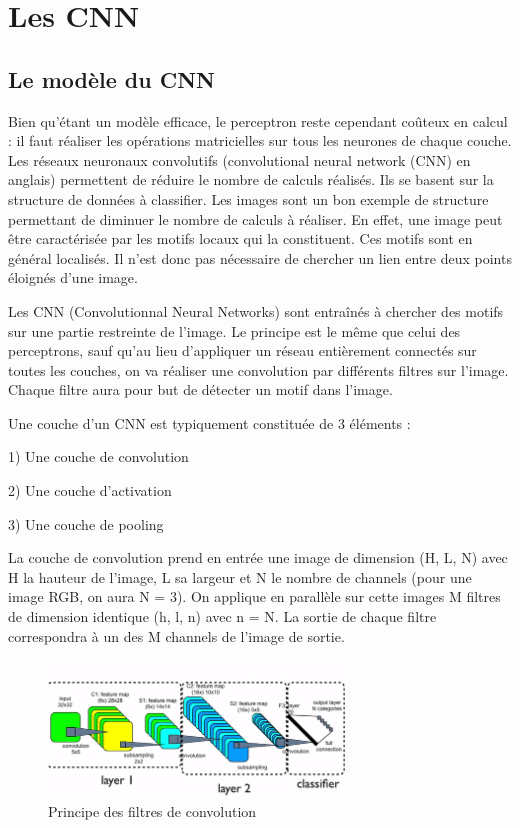 \section{Les CNN}

\fancyhead[R]{\textit{\nouppercase{\leftmark}}}

\subsection{Le modèle du CNN}

Bien qu'étant un modèle efficace, le perceptron reste cependant coûteux en calcul : il faut réaliser les opérations matricielles sur tous les neurones de chaque couche.
Les réseaux neuronaux convolutifs (convolutional neural network (CNN) en anglais) permettent de réduire le nombre de calculs réalisés. Ils se basent sur la structure de données à classifier.
Les images sont un bon exemple de structure permettant de diminuer le nombre de calculs à réaliser. En effet, une image peut être caractérisée par les motifs locaux qui la constituent. Ces motifs sont en général localisés. Il n'est donc pas nécessaire de chercher un lien entre deux points éloignés d'une image.

Les CNN (Convolutionnal Neural Networks) sont entraînés à chercher des motifs sur une partie restreinte de l'image.
Le principe est le même que celui des perceptrons, sauf qu'au lieu d'appliquer un réseau entièrement connectés sur toutes les couches, on va réaliser une convolution par différents filtres sur l'image. Chaque filtre aura pour but de détecter un motif dans l'image.

Une couche d'un CNN est typiquement constituée de 3 éléments : 

1) Une couche de convolution

2) Une couche d'activation 

3) Une couche de pooling


La couche de convolution prend en entrée une image de dimension (H, L, N) avec H la hauteur de l'image, L sa largeur et N le nombre de channels (pour une image RGB, on aura N = 3). 
On applique en parallèle sur cette images M filtres de dimension identique (h, l, n) avec n = N.
La sortie de chaque filtre correspondra à un des M channels de l'image de sortie.

\begin{figure}[h]
 \centering
 \includegraphics[width=0.7\textwidth]{img/CNN_filtre.png}
 \caption{Principe des filtres de convolution}
\end{figure}


